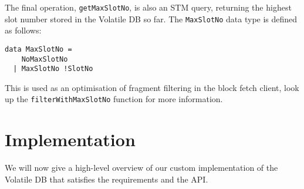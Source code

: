 The final operation, \lstinline!getMaxSlotNo!, is also an STM query, returning
the highest slot number stored in the Volatile DB so far. The
\lstinline!MaxSlotNo! data type is defined as follows:
\begin{lstlisting}
data MaxSlotNo =
    NoMaxSlotNo
  | MaxSlotNo !SlotNo
\end{lstlisting}
This is used as an optimisation of fragment filtering in the block fetch
client, look up the \lstinline!filterWithMaxSlotNo! function for more
information.

\section{Implementation}
\label{volatile:implementation}

We will now give a high-level overview of our custom implementation of the
Volatile DB that satisfies the requirements and the API.

